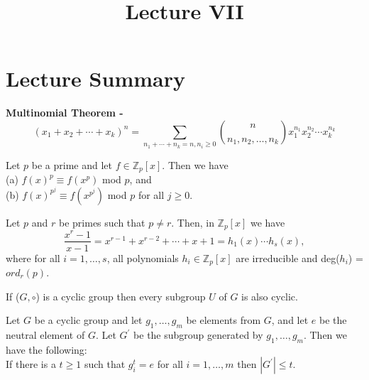 \documentclass[a4paper]{article}
\title{\vspace{-2cm}Lecture VII\vspace{-2cm}}
\date{}
\begin{document}
\maketitle
\section{Lecture Summary}
\begin{theorem}
\textbf{Multinomial Theorem -} 
$$(x_{1}+x_{2} + \cdots + x_{k})^{n} = \sum_{n_{1} + \cdots + n_{k} = n,  n_{i} \geq 0} \binom{n}{n_{1}, n_{2}, \ldots, n_{k}} x_{1}^{n_{1}}x_{2}^{n_{2}} \cdots x_{k}^{n_{k}}$$
\end{theorem}


\begin{theorem}
Let $p$ be a prime and let $f \in \mathbb{Z}_{p}[x]$. Then we have\\
(a) $f(x)^{p} \equiv f(x^{p})$ mod $p$, and\\
(b) $f(x)^{p^{j}} \equiv f(x^{p^{j}})$ mod $p$ for all $j \geq 0$.
\end{theorem}


\begin{theorem}
Let $p$ and $r$ be primes such that $p \neq r$. Then, in $\mathbb{Z}_{p}[x]$ we have
$$\frac{x^{r} - 1}{x - 1} = x^{r - 1} + x^{r - 2} + \cdots + x + 1 = h_{1}(x) \cdots h_{s}(x),$$
where for all $i = 1, \ldots, s$, all polynomials $h_{i} \in \mathbb{Z}_{p}[x]$ are irreducible and deg($h_{i}$) = $ord_{r}(p)$.
\end{theorem}


\begin{lemma}
If ($G, \circ$) is a cyclic group then every subgroup $U$ of $G$ is also cyclic.
\end{lemma}


\begin{lemma}
Let $G$ be a cyclic group and let $g_{1}, \ldots, g_{m}$ be elements from $G$, and let $e$ be the neutral element of $G$. Let $G^{'}$ be the subgroup generated by $g_{1}, \ldots, g_{m}$. Then we have the following: \\
If there is a $t \geq 1$ such that $g_{i}^{t} = e$ for all $i = 1, \ldots, m$ then $|G^{'}| \leq t$.
\end{lemma}
\end{document}
